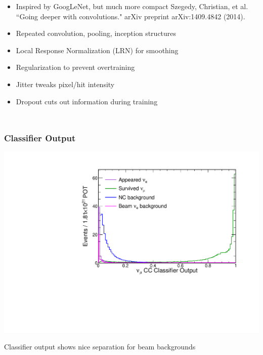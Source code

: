 \documentclass[10pt,professionalfonts,xcolor=table]{beamer}
\begin{document}
\begin{frame}
\begin{columns}
  \begin{itemize}
  \item Inspired by GoogLeNet, but much more compact
  \bangon
  \bong Szegedy, Christian, et al. ``Going deeper with convolutions." arXiv preprint arXiv:1409.4842 (2014).
  \bangoff
  \gap
  \item Repeated convolution, pooling, inception structures
  \gap
  \item Local Response Normalization (LRN) for smoothing
  \gap
  \item Regularization to prevent overtraining
    \bangon
    \item Jitter tweaks pixel/hit intensity
    \item Dropout cuts out information during training
    \bangoff
  \end{itemize}
  \end{columns}
\end{frame}






\begin{frame}
\frametitle{Classifier Output}
  \begin{center}
   \includegraphics[height=0.7\textwidth, angle=-90]{figures/cnn/numu_pid_dist.pdf}
  \end{center}

  \bangon
  \item Classifier output shows nice separation for beam backgrounds
  \bangoff
\end{frame}
\end{document}
